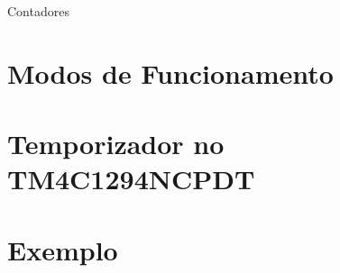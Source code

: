 
Contadores 
\section{Modos de Funcionamento}

\section{Temporizador no TM4C1294NCPDT}

\section{Exemplo}